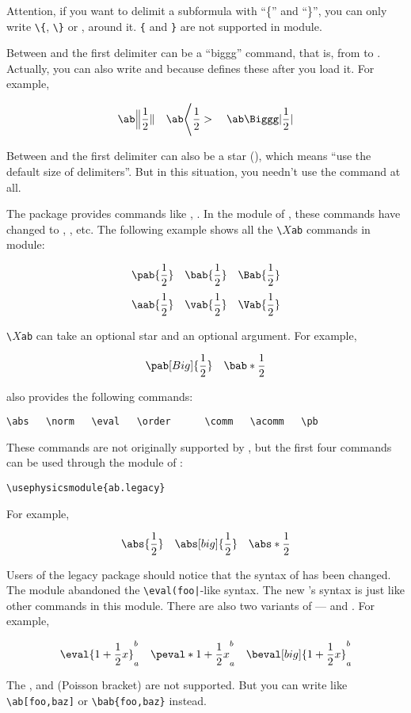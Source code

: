 \documentclass[11pt,letterpaper]{article}
\begin{document}
\pardanger Attention, if you want to delimit a subformula with ``\{'' and
``\}'', you can only write \verb|\{|, \verb|\}| or , 
around it. \verb|{| and \verb|}| are not supported in  module.

Between  and the first delimiter can be a ``biggg'' command, that is,
from  to . Actually, you can also write  and
 because  defines these after you load it. For example,
\begin{example}
\[ \ab\Big \| \frac12 \| \quad
   \ab\Bigg < \frac12 >  \quad
   \ab\Biggg| \frac12 |  \]
\end{example}
Between  and the first delimiter can also be a star (\opt{*}), which
means ``use the default size of delimiters''. But in this situation, you
needn't use the  command at all.

The  package provides commands like , . In
the  module of , these commands have changed to
, , etc. The following example shows all the 
\texttt{\textbackslash}$X$\texttt{ab} commands in  module:
\begin{example}
\def\0{\frac12}
\[ \pab{\0} \quad \bab{\0}
            \quad \Bab{\0} \]
\[ \aab{\0} \quad \vab{\0}
            \quad \Vab{\0} \]
\end{example}
\texttt{\textbackslash$X$ab} can take an optional star and an optional 
argument. For example,
\begin{example}
\def\0{\frac12}
\[ \pab[Big]{\0} \quad \bab*{\0} \]
\end{example}

 also provides the following commands:
\begin{Verbatim}[fontsize=\small]
\abs   \norm   \eval   \order      \comm   \acomm   \pb
\end{Verbatim}
\pardanger These commands are not originally supported by , but
the first four commands can be used through the  module of
:
\begin{Verbatim}
\usephysicsmodule{ab.legacy}
\end{Verbatim}
For example,
\begin{example}
\def\0{\frac12}
\[ \abs{\0} \quad \abs[big]{\0}
            \quad \abs*{\0}    \]
\end{example}
Users of the legacy  package should notice that the syntax of
 has been changed. The  module abandoned the 
\verb"\eval(foo|"-like syntax. The new 's syntax is just like other
commands in this module. There are also two variants of  --- 
and . For example,
\begin{example}
\def\0{1+\frac12x}
\[ \eval{\0}_a^b      \quad
   \peval*{\0}_a^b    \quad
   \beval[big]{\0}_a^b   \]
\end{example}
The ,  and  (Poisson bracket) are not supported.
But you can write like \verb|\ab[foo,baz]| or \verb|\bab{foo,baz}| instead.
\end{document}
